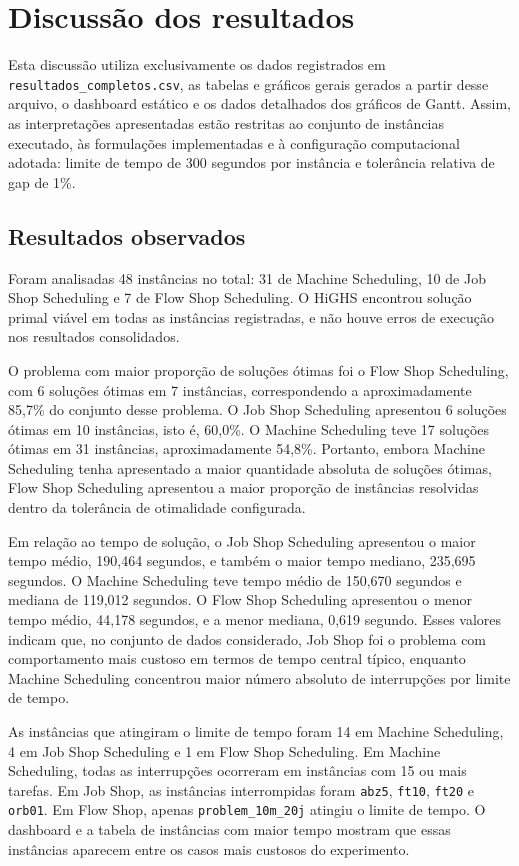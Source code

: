 \section{Discussão dos resultados}

Esta discussão utiliza exclusivamente os dados registrados em
\texttt{resultados\_completos.csv}, as tabelas e gráficos gerais gerados a partir
desse arquivo, o dashboard estático e os dados detalhados dos gráficos de Gantt.
Assim, as interpretações apresentadas estão restritas ao conjunto de instâncias
executado, às formulações implementadas e à configuração computacional adotada:
limite de tempo de 300 segundos por instância e tolerância relativa de gap de
1\%.

\subsection{Resultados observados}

Foram analisadas 48 instâncias no total: 31 de Machine Scheduling, 10 de Job
Shop Scheduling e 7 de Flow Shop Scheduling. O HiGHS encontrou solução primal
viável em todas as instâncias registradas, e não houve erros de execução nos
resultados consolidados.

O problema com maior proporção de soluções ótimas foi o Flow Shop Scheduling,
com 6 soluções ótimas em 7 instâncias, correspondendo a aproximadamente 85,7\%
do conjunto desse problema. O Job Shop Scheduling apresentou 6 soluções ótimas
em 10 instâncias, isto é, 60,0\%. O Machine Scheduling teve 17 soluções ótimas
em 31 instâncias, aproximadamente 54,8\%. Portanto, embora Machine Scheduling
tenha apresentado a maior quantidade absoluta de soluções ótimas, Flow Shop
Scheduling apresentou a maior proporção de instâncias resolvidas dentro da
tolerância de otimalidade configurada.

Em relação ao tempo de solução, o Job Shop Scheduling apresentou o maior tempo
médio, 190,464 segundos, e também o maior tempo mediano, 235,695 segundos. O
Machine Scheduling teve tempo médio de 150,670 segundos e mediana de 119,012
segundos. O Flow Shop Scheduling apresentou o menor tempo médio, 44,178
segundos, e a menor mediana, 0,619 segundo. Esses valores indicam que, no
conjunto de dados considerado, Job Shop foi o problema com comportamento mais
custoso em termos de tempo central típico, enquanto Machine Scheduling concentrou
maior número absoluto de interrupções por limite de tempo.

As instâncias que atingiram o limite de tempo foram 14 em Machine Scheduling, 4
em Job Shop Scheduling e 1 em Flow Shop Scheduling. Em Machine Scheduling, todas
as interrupções ocorreram em instâncias com 15 ou mais tarefas. Em Job Shop, as
instâncias interrompidas foram \texttt{abz5}, \texttt{ft10}, \texttt{ft20} e
\texttt{orb01}. Em Flow Shop, apenas \texttt{problem\_10m\_20j} atingiu o limite
de tempo. O dashboard e a tabela de instâncias com maior tempo mostram que
essas instâncias aparecem entre os casos mais custosos do experimento.


